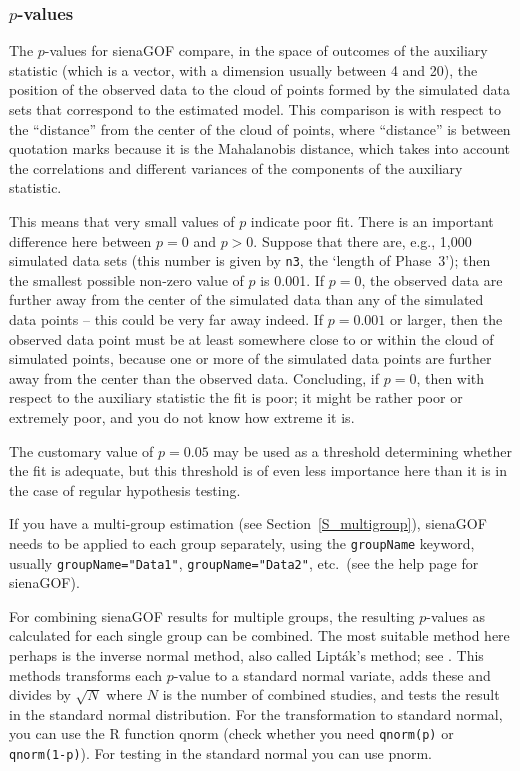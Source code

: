 \documentclass[a4paper,fleqn,11pt]{article}
\newcommand{\+}{\, + \,}
\newcommand{\sfn}[1]{\textsf{#1}}
\newcommand{\R}{{\sf R }}
\begin{document}
\subsubsection{$p$-values}
The $p$-values for \sfn{sienaGOF} compare, in the space of outcomes
of the auxiliary statistic (which is a vector,
with a dimension usually between 4 and 20),
the position of the observed data to the cloud of
points formed by the simulated data sets that correspond
to the estimated model. This comparison is with respect to the
``distance'' from the center of the cloud of points,
where ``distance'' is between quotation marks because it is the
Mahalanobis distance, which takes into account the correlations
and different variances of the components of the auxiliary statistic.

This means that very small values of $p$ indicate poor fit.
There is an important difference here between $p=0$ and $p>0$.
Suppose that there are, e.g., 1,000 simulated data sets
(this number is given by \texttt{n3}, the `length of Phase~3');
then the smallest possible non-zero value of $p$ is 0.001.
If $p=0$, the observed data are further away from the center of
the simulated data than any of the simulated data points -- this
could be very far away indeed. If $p=0.001$ or larger, then
the observed data point must be at least somewhere close to or within the
cloud of simulated points, because one or more of the simulated data
points are further away from the center than the observed data.
Concluding, if $p=0$, then with respect to the auxiliary statistic
the fit is poor; it might be rather poor or extremely poor,
and you do not know how extreme it is.

The customary value of $p=0.05$ may be used as a threshold determining
whether the fit is adequate, but this threshold is of even less
importance here than it is in the case of regular hypothesis testing.

If you have a multi-group estimation (see Section~\ref{S_multigroup}),
\sfn{sienaGOF} needs to be applied to each group separately,
using the \texttt{groupName} keyword, usually
\texttt{groupName="Data1"},  \texttt{groupName="Data2"}, etc.\
(see the help page for \sfn{sienaGOF}).

For combining \sfn{sienaGOF} results for multiple groups,
the resulting $p$-values
as calculated for each single group can be combined.
The most suitable method here perhaps is the inverse normal method,
also called Lipt\'{a}k's method; see \citet[][Section C.3]{HedgesOlkin85}.
This methods transforms each $p$-value to a standard normal variate, adds these
and divides by $\sqrt{N}$ where $N$ is the number of combined studies,
and tests the result in the standard normal distribution.
For the transformation to standard normal,
you can use the \R function \sfn{qnorm}
(check whether you need \texttt{qnorm(p)} or \texttt{qnorm(1-p)}).
For testing in the standard normal you can use \sfn{pnorm}.
\end{document}
